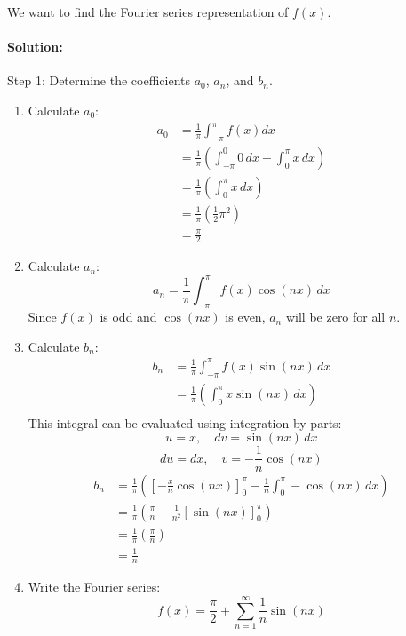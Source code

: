 We want to find the Fourier series representation of \( f(x) \).
\paragraph{Solution:} Step 1: Determine the coefficients \( a_0 \), \( a_n \), and \( b_n \).
\begin{enumerate}
	\item Calculate \( a_0 \):
		\begin{align*}
			a_0 &= \frac{1}{\pi} \int_{-\pi}^{\pi} f(x) dx \\
				&= \frac{1}{\pi} \left( \int_{-\pi}^{0} 0 \, dx + \int_{0}^{\pi} x \, dx \right) \\
				&= \frac{1}{\pi} \left( \int_{0}^{\pi} x \, dx \right) \\
				&= \frac{1}{\pi} \left( \frac{1}{2} \pi^2 \right) \\
				&= \frac{\pi}{2} 
		\end{align*}
	\item Calculate \( a_n \): \[ a_n = \frac{1}{\pi} \int_{-\pi}^{\pi} f(x) \cos(nx) \, dx \]
Since \( f(x) \) is odd and \( \cos(nx) \) is even, \( a_n \) will be zero for all \( n \).
	\item Calculate \( b_n \):
		\begin{align*}
			b_n &= \frac{1}{\pi} \int_{-\pi}^{\pi} f(x) \sin(nx) \, dx \\
				&= \frac{1}{\pi} \left( \int_{0}^{\pi} x \sin(nx) \, dx \right) \\
		\end{align*}
		This integral can be evaluated using integration by parts:
\[ u = x, \quad dv = \sin(nx) \, dx \]
\[ du = dx, \quad v = -\frac{1}{n} \cos(nx) \]
\begin{align*}
	b_n &= \frac{1}{\pi} \left( \left[ -\frac{x}{n} \cos(nx) \right]_{0}^{\pi} - \frac{1}{n} \int_{0}^{\pi} -\cos(nx) \, dx \right)\\
		&= \frac{1}{\pi} \left( \frac{\pi}{n} - \frac{1}{n^2} \left[ \sin(nx) \right]_{0}^{\pi} \right)\\
		&= \frac{1}{\pi} \left( \frac{\pi}{n} \right) \\
		&= \frac{1}{n} 
\end{align*}
	\item Write the Fourier series:
\[ f(x) = \frac{\pi}{2} + \sum_{n=1}^{\infty} \frac{1}{n} \sin(nx) \]
\end{enumerate}




